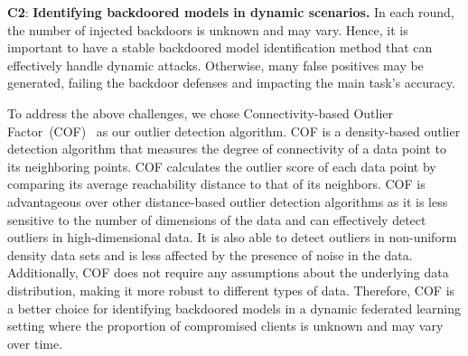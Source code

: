 {%

\noindent\textbf{C2}: \textbf{Identifying backdoored models in dynamic scenarios.} In each round, the number of injected backdoors is unknown and may vary. Hence, it is important to have a stable backdoored model identification method that can effectively handle dynamic attacks. Otherwise, many false positives may be generated, failing the backdoor defenses and impacting the main task's accuracy.


To address the above challenges, we chose Connectivity-based Outlier Factor~(COF)~\cite{cof} as our outlier detection algorithm. COF is a density-based outlier detection algorithm that measures the degree of connectivity of a data point to its neighboring points. COF calculates the outlier score of each data point by comparing its average reachability distance to that of its neighbors. COF is advantageous over other distance-based outlier detection algorithms as it is less sensitive to the number of dimensions of the data and can effectively detect outliers in high-dimensional data. It is also able to detect outliers in non-uniform density data sets and is less affected by the presence of noise in the data. Additionally, COF does not require any assumptions about the underlying data distribution, making it more robust to different types of data. Therefore, COF is a better choice for identifying backdoored models in a dynamic federated learning setting where the proportion of compromised clients is unknown and may vary over time.


}
